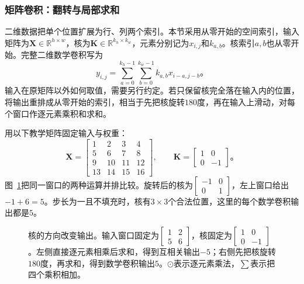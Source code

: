 \subsubsection{矩阵卷积：翻转与局部求和}
\label{sec:cnn-matrix-operation}

二维数据把单个位置扩展为行、列两个索引。本节采用从零开始的空间索引，输入矩阵为$\bm X\in\mathbb R^{h\times w}$，核为$\bm K\in\mathbb R^{k_h\times k_w}$，元素分别记为$x_{i,j}$和$k_{a,b}$。核索引$a,b$也从零开始。完整二维数学卷积写为
\begin{equation}
  y_{i,j}=\sum_{a=0}^{k_h-1}\sum_{b=0}^{k_w-1}
    k_{a,b}x_{i-a,j-b}\text{。}
  \label{eq:cnn-matrix-convolution}
\end{equation}
输入在原矩阵以外如何取值，需要另行约定。若只保留核完全落在输入内的位置，将输出重排成从零开始的索引，相当于先把核旋转$180$度，再在输入上滑动，对每个窗口作逐元素乘积和求和。

用以下教学矩阵固定输入与权重：
\begin{equation}
  \bm X=\begin{bmatrix}
    1&2&3&4\\5&6&7&8\\9&10&11&12\\13&14&15&16
  \end{bmatrix},\qquad
  \bm K=\begin{bmatrix}1&0\\0&-1\end{bmatrix}\text{。}
  \label{eq:cnn-matrix-example}
\end{equation}
图~\ref{fig:cnn-kernel-flip}把同一窗口的两种运算并排比较。旋转后的核为$\left[\begin{smallmatrix}-1&0\\0&1\end{smallmatrix}\right]$，左上窗口给出$-1+6=5$。步长为一且不填充时，核有$3\times3$个合法位置，这里的每个数学卷积输出都是$5$。


\begin{figure}[htb]
  \centering
  
  \caption{核的方向改变输出。输入窗口固定为$\left[\begin{smallmatrix}1&2\\5&6\end{smallmatrix}\right]$，核固定为$\left[\begin{smallmatrix}1&0\\0&-1\end{smallmatrix}\right]$。左侧直接逐元素相乘后求和，得到互相关输出$-5$；右侧先把核旋转$180$度，再求和，得到数学卷积输出$5$。$\odot$表示逐元素乘法，$\sum$表示把四个乘积相加。}
  \label{fig:cnn-kernel-flip}
\end{figure}
